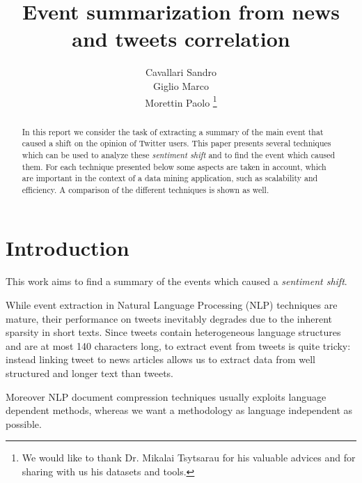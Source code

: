 \documentclass{acm_proc_article-sp-sigmod07}
\begin{document}
\title{Event summarization from news and tweets correlation}
\author{Cavallari Sandro\\Giglio Marco\\Morettin Paolo
\thanks{We would like to thank Dr. Mikalai Tsytsarau for his valuable advices and for sharing with us his datasets and tools.}}

%
\maketitle
\begin{abstract}
In this report we consider the task of extracting a summary of the main event
that caused a shift on the opinion of Twitter users. This paper presents
several techniques which can be used to analyze these \emph{sentiment shift}
and to find the event which caused them. For each technique presented below
some aspects are taken in account, which are important in the context of a data
mining application, such as scalability and efficiency. A comparison of the
different techniques is shown as well.\end{abstract}   

\section{Introduction}
This work aims to find a summary of the events which caused a \emph{sentiment shift}. 

While event extraction in Natural Language Processing (NLP) techniques are mature,
their performance on tweets inevitably degrades due to the inherent sparsity in
short texts.  Since tweets contain heterogeneous language structures and are at
most 140 characters long, to extract event from tweets is quite tricky: instead
linking tweet to news articles allows us to extract data from well structured
and longer text than tweets.


Moreover NLP document compression techniques usually exploits language
dependent methods, whereas we want a methodology as language independent as
possible. 
\end{document}
